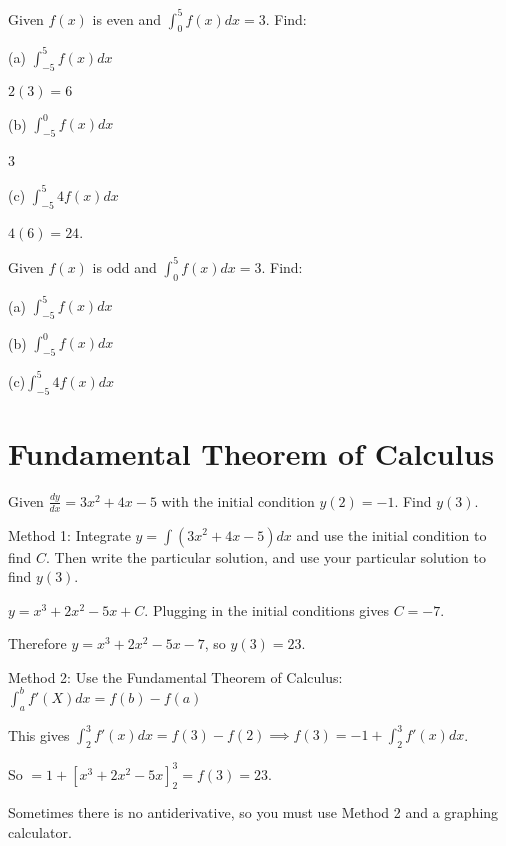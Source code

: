 \documentclass[../bccalc.tex]{subfiles}
\begin{document}
\begin{example}
    Given $f(x)$ is even and $\int_0^5 f(x)dx=3$. Find:

    (a) $\int_{-5}^5 f(x)dx$

    $2(3)=6$

    (b) $\int_{-5}^0 f(x)dx$

    3

    (c) $\int_{-5}^5 4f(x)dx$

    $4(6)=24$.
\end{example}

\ex Given $f(x)$ is odd and $\int_0^5 f(x)dx=3$. Find:

(a) $\int_{-5}^5 f(x)dx$

(b) $\int_{-5}^0 f(x)dx$

(c)$ \int_{-5}^5 4f(x)dx$

\section{Fundamental Theorem of Calculus}
\begin{example}
    Given $\frac{dy}{dx}=3x^2+4x-5$ with the initial condition $y(2)=-1$. Find $y(3)$.

    Method 1: Integrate $y=\int(3x^2+4x-5)dx$ and use the initial condition to find $C$. Then write the particular solution, and use your particular solution to find $y(3)$.

    $y=x^3+2x^2-5x+C$. Plugging in the initial conditions gives $C=-7$.

    Therefore $y=x^3+2x^2-5x-7$, so $y(3)=23$.

    Method 2: Use the Fundamental Theorem of Calculus: $\int_a^b f'(X)dx=f(b)-f(a)$

    This gives $\int_2^3 f'(x)dx=f(3)-f(2)\implies f(3)=-1+\int_2^3 f'(x)dx$.

    So $=1+[x^3+2x^2-5x]_2^3 = f(3)=23$.
\end{example}

Sometimes there is no antiderivative, so you must use Method 2 and a graphing calculator.
\end{document}
